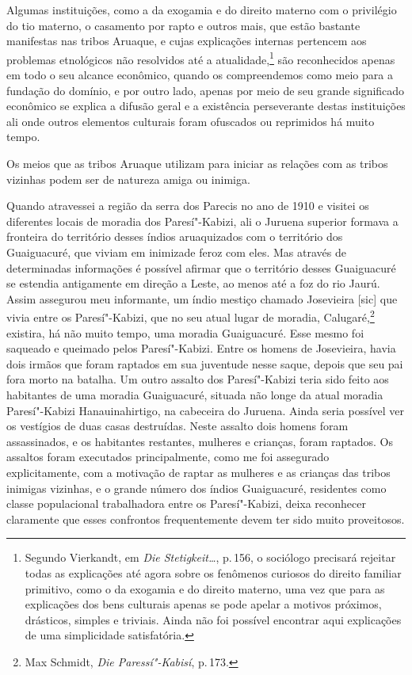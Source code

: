 Algumas instituições, como a da exogamia e do direito materno com o
privilégio do tio materno, o casamento por rapto e outros mais, que
estão bastante manifestas nas tribos Aruaque, e cujas explicações
internas pertencem aos problemas etnológicos não resolvidos até a
atualidade,\footnote{Segundo Vierkandt, em \textit{Die Stetigkeit\ldots}, p.\,156, o sociólogo precisará rejeitar todas as
  explicações até agora sobre os fenômenos curiosos do direito familiar
  primitivo, como o da exogamia e do direito materno, uma vez que para
  as explicações dos bens culturais apenas se pode apelar a motivos
  próximos, drásticos, simples e triviais. Ainda não foi possível
  encontrar aqui explicações de uma simplicidade satisfatória.} são
reconhecidos apenas em todo o seu alcance econômico, quando os
compreendemos como meio para a fundação do domínio, e por outro lado,
apenas por meio de seu grande significado econômico se explica a difusão
geral e a existência perseverante destas instituições ali onde outros
elementos culturais foram ofuscados ou reprimidos há muito tempo.

Os meios que as tribos Aruaque utilizam para iniciar as relações com as
tribos vizinhas podem ser de natureza amiga ou inimiga.

Quando atravessei a região da serra dos Parecis no ano de 1910 e visitei
os diferentes locais de moradia dos Paresí"-Kabizi, ali o Juruena
superior formava a fronteira do território desses índios aruaquizados
com o território dos Guaiguacuré, que viviam em inimizade feroz com
eles. Mas através de determinadas informações é possível afirmar que o
território desses Guaiguacuré se estendia antigamente em direção a
Leste, ao menos até a foz do rio Jaurú. Assim assegurou meu
informante, um índio mestiço chamado Josevieira {[}sic{]} que vivia
entre os Paresí"-Kabizi, que no seu atual lugar de moradia, 
Calugaré,\footnote{Max Schmidt, \textit{Die Paressí"-Kabisí}, p.\,173.}
existira, há não muito tempo, uma moradia Guaiguacuré. Esse mesmo foi
saqueado e queimado pelos Paresí"-Kabizi. Entre os homens de Josevieira,
havia dois irmãos que foram raptados em sua juventude nesse saque,
depois que seu pai fora morto na batalha. Um outro assalto dos
Paresí"-Kabizi teria sido feito aos habitantes de uma moradia
Guaiguacuré, situada não longe da atual moradia Paresí"-Kabizi
Hanauinahirtigo, na cabeceira do Juruena. Ainda seria possível ver os
vestígios de duas casas destruídas. Neste assalto dois homens foram
assassinados, e os habitantes restantes, mulheres e crianças, foram
raptados. Os assaltos foram executados principalmente, como me foi
assegurado explicitamente, com a motivação de raptar as mulheres e as
crianças das tribos inimigas vizinhas, e o grande número dos índios
Guaiguacuré, residentes como classe populacional trabalhadora entre os
Paresí"-Kabizi, deixa reconhecer claramente que esses confrontos
frequentemente devem ter sido muito proveitosos. 

